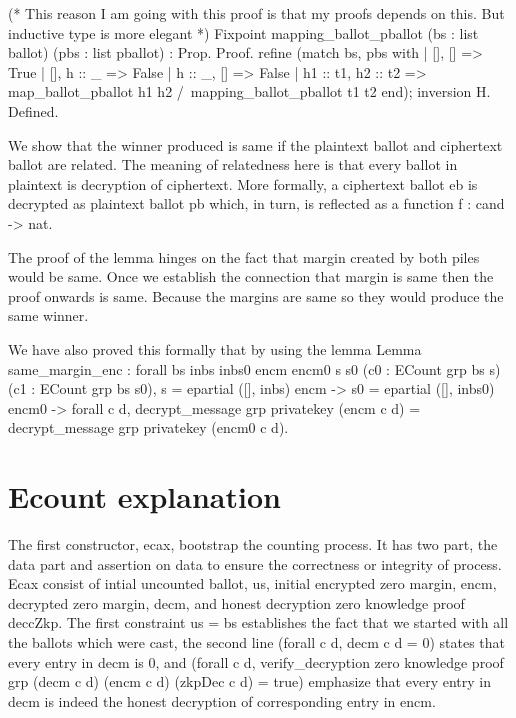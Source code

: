     (* This reason I am going with this proof is that my proofs depends on this. 
       But inductive type is more elegant *)
    Fixpoint mapping_ballot_pballot (bs : list ballot) (pbs : list pballot) : Prop. 
    Proof.
      refine (match bs, pbs with
              | [], [] => True
              | [], h :: _ => False 
              | h :: _, [] => False
              | h1 :: t1, h2 :: t2 =>
                map_ballot_pballot h1 h2 /\
                 mapping_ballot_pballot t1 t2
              end); inversion H.
    Defined.
    
 
We show that the winner produced is same if the plaintext ballot and ciphertext ballot are related.  The meaning 
of relatedness here is that every ballot in plaintext is decryption of ciphertext. More formally, a ciphertext ballot 
eb is decrypted as plaintext ballot pb which, in turn, is reflected as a function f : cand -> nat. 

The proof of the lemma hinges on the fact that margin created by both piles would be same.  Once we establish 
the connection that margin is same then the proof onwards is same. Because the margins are same so they would produce the 
same winner. 

We have also proved this formally that by using the lemma 
Lemma same_margin_enc :
      forall bs inbs inbs0 encm encm0 s s0 (c0 : ECount grp bs s) (c1 :  ECount grp bs s0),  
        s = epartial ([], inbs) encm ->
        s0 = epartial ([], inbs0) encm0 ->
        forall c d, decrypt_message grp privatekey (encm c d) =
               decrypt_message grp privatekey (encm0 c d). 
               
          

\section{Ecount explanation}
The first constructor, ecax, bootstrap the counting process. It has two part, the data part and assertion on data to 
ensure the correctness or integrity of process. Ecax consist of intial uncounted ballot, us, initial encrypted zero margin, 
encm, decrypted zero margin, decm, and honest decryption zero knowledge proof deccZkp. The first constraint us = bs 
establishes the fact that we started with all the ballots which were cast, the second line (forall c d, decm c d = 0) states 
that every entry in decm is 0, and (forall c d, verify_decryption zero knowledge proof grp (decm c d) (encm c d) (zkpDec c d) = true) 
emphasize that every entry in decm is indeed the honest decryption of corresponding entry in encm. 

